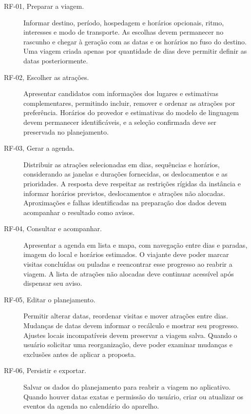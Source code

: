 \begin{description}
  \item[RF-01, Preparar a viagem.] Informar destino, período, hospedagem e horários opcionais, ritmo, interesses e modo de transporte. As escolhas devem permanecer no rascunho e chegar à geração com as datas e os horários no fuso do destino. Uma viagem criada apenas por quantidade de dias deve permitir definir as datas posteriormente.

  \item[RF-02, Escolher as atrações.] Apresentar candidatos com informações dos lugares e estimativas complementares, permitindo incluir, remover e ordenar as atrações por preferência. Horários do provedor e estimativas do modelo de linguagem devem permanecer identificáveis, e a seleção confirmada deve ser preservada no planejamento.

  \item[RF-03, Gerar a agenda.] Distribuir as atrações selecionadas em dias, sequências e horários, considerando as janelas e durações fornecidas, os deslocamentos e as prioridades. A resposta deve respeitar as restrições rígidas da instância e informar horários previstos, deslocamentos e atrações não alocadas. Aproximações e falhas identificadas na preparação dos dados devem acompanhar o resultado como avisos.

  \item[RF-04, Consultar e acompanhar.] Apresentar a agenda em lista e mapa, com navegação entre dias e paradas, imagem do local e horários estimados. O viajante deve poder marcar visitas concluídas ou puladas e reencontrar esse progresso ao reabrir a viagem. A lista de atrações não alocadas deve continuar acessível após dispensar seu aviso.

  \item[RF-05, Editar o planejamento.] Permitir alterar datas, reordenar visitas e mover atrações entre dias. Mudanças de datas devem informar o recálculo e mostrar seu progresso. Ajustes locais incompatíveis devem preservar a viagem salva. Quando o usuário solicitar uma reorganização, deve poder examinar mudanças e exclusões antes de aplicar a proposta.

  \item[RF-06, Persistir e exportar.] Salvar os dados do planejamento para reabrir a viagem no aplicativo. Quando houver datas exatas e permissão do usuário, criar ou atualizar os eventos da agenda no calendário do aparelho.
\end{description}

